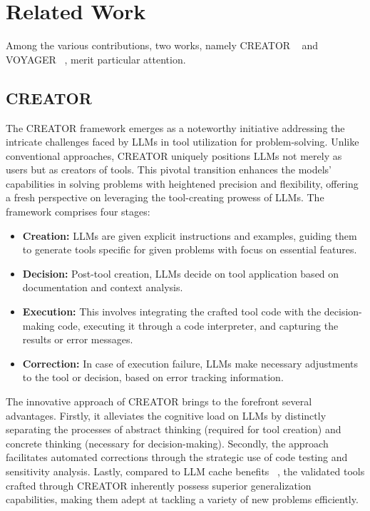 \section{Related Work}

Among the various contributions, two works, namely CREATOR ~\cite{qian2023creator} and VOYAGER ~\cite{wang2023voyager}, merit particular attention.

\subsection{CREATOR}

The CREATOR framework emerges as a noteworthy initiative addressing the intricate challenges faced by LLMs in tool utilization for problem-solving. Unlike conventional approaches, CREATOR uniquely positions LLMs not merely as users but as creators of tools. This pivotal transition enhances the models’ capabilities in solving problems with heightened precision and flexibility, offering a fresh perspective on leveraging the tool-creating prowess of LLMs. The framework comprises four stages:
\begin{itemize}
    \item \textbf{Creation:} LLMs are given explicit instructions and examples, guiding them to generate tools specific for given problems with focus on essential features.
    \item \textbf{Decision:} Post-tool creation, LLMs decide on tool application based on documentation and context analysis.
    \item \textbf{Execution:} This involves integrating the crafted tool code with the decision-making code, executing it through a code interpreter, and capturing the results or error messages.
    \item \textbf{Correction:} In case of execution failure, LLMs make necessary adjustments to the tool or decision, based on error tracking information.
\end{itemize}

The innovative approach of CREATOR brings to the forefront several advantages. Firstly, it alleviates the cognitive load on LLMs by distinctly separating the processes of abstract thinking (required for tool creation) and concrete thinking (necessary for decision-making). Secondly, the approach facilitates automated corrections through the strategic use of code testing and sensitivity analysis. Lastly, compared to LLM cache benefits ~\cite{GPTCache}, the validated tools crafted through CREATOR inherently possess superior generalization capabilities, making them adept at tackling a variety of new problems efficiently.

